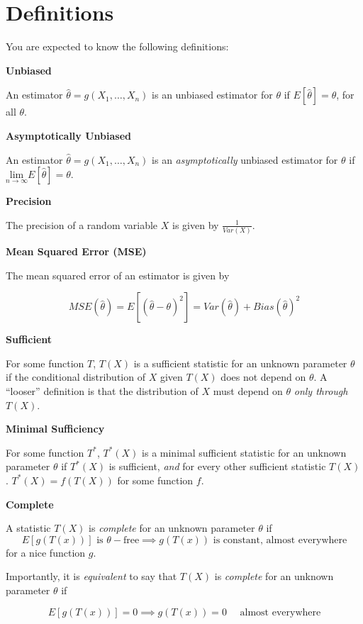 \documentclass[
  letterpaper,
  DIV=11,
  numbers=noendperiod]{scrreprt}
\begin{document}
\section{Definitions}\label{definitions-3}

You are expected to know the following definitions:

\textbf{Unbiased}

An estimator \(\hat{\theta} = g(X_1, \dots, X_n)\) is an unbiased
estimator for \(\theta\) if \(E[\hat{\theta}] = \theta\), for all
\(\theta\).

\textbf{Asymptotically Unbiased}

An estimator \(\hat{\theta} = g(X_1, \dots, X_n)\) is an
\emph{asymptotically} unbiased estimator for \(\theta\) if
\(\underset{n \to \infty}{\text{lim}} E[\hat{\theta}] = \theta\).

\textbf{Precision}

The precision of a random variable \(X\) is given by
\(\frac{1}{Var(X)}\).

\textbf{Mean Squared Error (MSE)}

The mean squared error of an estimator is given by

\[
MSE(\hat{\theta}) = E[(\hat{\theta} - \theta)^2] = Var(\hat{\theta}) + Bias(\hat{\theta})^2
\]

\textbf{Sufficient}

For some function \(T\), \(T(X)\) is a sufficient statistic for an
unknown parameter \(\theta\) if the conditional distribution of \(X\)
given \(T(X)\) does not depend on \(\theta\). A ``looser'' definition is
that the distribution of \(X\) must depend on \(\theta\) \emph{only
through} \(T(X)\).

\textbf{Minimal Sufficiency}

For some function \(T^*\), \(T^*(X)\) is a minimal sufficient statistic
for an unknown parameter \(\theta\) if \(T^*(X)\) is sufficient,
\emph{and} for every other sufficient statistic \(T(X)\).
\(T^*(X) = f(T(X))\) for some function \(f\).

\textbf{Complete}

A statistic \(T(X)\) is \emph{complete} for an unknown parameter
\(\theta\) if \[
E[g(T(x))] \text{ is } \theta-\text{free} \implies g(T(x)) \text{ is constant, almost everywhere}
\] for a nice function \(g\).

Importantly, it is \emph{equivalent} to say that \(T(X)\) is
\emph{complete} for an unknown parameter \(\theta\) if

\[
E[g(T(x))] = 0 \implies g(T(x)) = 0 \quad\text{ almost everywhere}
\]
\end{document}
